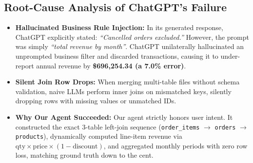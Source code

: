\documentclass[11pt,a4paper]{article}
\begin{document}
\subsection{Root-Cause Analysis of ChatGPT's Failure}
\begin{itemize}[leftmargin=1.0cm]
\item \textbf{Hallucinated Business Rule Injection:} In its generated response, ChatGPT explicitly stated: \emph{``Cancelled orders excluded.''} However, the prompt was simply \emph{``total revenue by month''}. ChatGPT unilaterally hallucinated an unprompted business filter and discarded transactions, causing it to under-report annual revenue by \textbf{\$696,254.34 (a 7.0\% error)}.
\item \textbf{Silent Join Row Drops:} When merging multi-table files without schema validation, naive LLMs perform inner joins on mismatched keys, silently dropping rows with missing values or unmatched IDs.
\item \textbf{Why Our Agent Succeeded:} Our agent strictly honors user intent. It constructed the exact 3-table left-join sequence (\texttt{order\_items} $\rightarrow$ \texttt{orders} $\rightarrow$ \texttt{products}), dynamically computed line-item revenue via $\text{qty} \times \text{price} \times (1 - \text{discount})$, and aggregated monthly periods with zero row loss, matching ground truth down to the cent.
\end{itemize}

\end{document}

